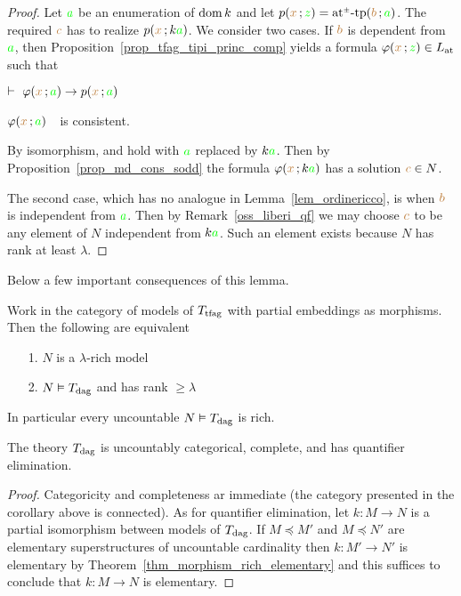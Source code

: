 \begin{proof}
Let ${\gr a}$ be an enumeration of $\dom k$ and let $p({\mr x}\,;{\gr z})=\atpmtp({\mr b}\,;{\gr a})$.
%
 The required ${\mr c}$ has to realize $p({\mr x}\,;k{\gr a})$.
%
We consider two cases.
%
If ${\mr b}$ is dependent from ${\gr a}$, then Proposition~\ref{prop_tfag_tipi_princ_comp} yields a formula $\phi({\mr x}\,;{\gr z})\in L_{\rm at}$ such that 

\noindent{}\hspace{5ex} $\proves\ \phi({\mr x}\,;{\gr a})\imp p({\mr x}\,;{\gr a})$

\noindent{}\hspace{5ex} $\phi({\mr x}\,;{\gr a})$\ \ is consistent.

By isomorphism,   and  hold with ${\gr a}$ replaced by $k{\gr a}$.
%
Then by Proposition~\ref{prop_md_cons_sodd} the formula $\phi({\mr x}\,;k{\gr a})$ has a solution ${\mr c} \in N$.

The second case, which has no analogue in Lemma~\ref{lem_ordinericco}, is when ${\mr b}$ is independent from ${\gr a}$.
%
Then by   Remark~\ref{oss_liberi_qf} we may choose ${\mr c}$ to be any element of $N$ independent from $k{\gr a}$.
%
Such an element exists because $N$ has rank at least $\lambda$.
\end{proof}

Below a few important consequences of this lemma.

\begin{corollary}\label{corol_acfUltraOmog}
Work in the category of models of $T_{\rm tfag}$ with partial embeddings as morphisms. Then the following are equivalent
%
\begin{itemize}
\item[1.] $N$ is a $\lambda$-rich model
\item[2.] $N\models T_{\rm dag}$ and has rank $\ge\lambda$
\end{itemize}
In particular every uncountable $N\models T_{\rm dag}$ is rich.
\end{corollary}

\begin{corollary}\label{corol_ModDivUltraOmog}
The theory $T_{\rm dag}$ is uncountably categorical, complete, and has quantifier elimination.
\end{corollary}

\begin{proof}
Categoricity and completeness ar immediate (the category presented in the corollary above is connected).
%
As for quantifier elimination, let $k:M\to N$ is a partial isomorphism between models of $T_{\rm dag}$.
%
If $M\preceq M'$ and $M\preceq N'$ are elementary superstructures of uncountable cardinality then $k:M'\to N'$ is elementary by Theorem~\ref{thm_morphism_rich_elementary} and this suffices to conclude that  $k:M\to N$ is elementary.
\end{proof}

